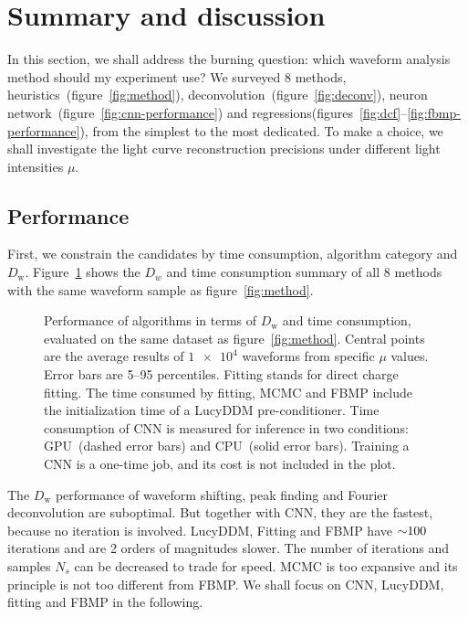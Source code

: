 \section{Summary and discussion}
\label{sec:discussion}

In this section, we shall address the burning question: which waveform analysis method should my experiment use?  We surveyed 8 methods, heuristics~(figure~\ref{fig:method}), deconvolution~(figure~\ref{fig:deconv}), neuron network~(figure~\ref{fig:cnn-performance}) and regressions(figures~\ref{fig:dcf}--\ref{fig:fbmp-performance}), from the simplest to the most dedicated.  To make a choice, we shall investigate the light curve reconstruction precisions under different light intensities $\mu$.

\subsection{Performance}

First, we constrain the candidates by time consumption, algorithm category and $D_\mathrm{w}$.  Figure~\ref{fig:chargesummary} shows the $D_w$ and time consumption summary of all 8 methods with the same waveform sample as figure~\ref{fig:method}.
\begin{figure}[H]
    \centering
    \resizebox{\textwidth}{!}{}
    \caption{\label{fig:chargesummary} Performance of algorithms in terms of $D_\mathrm{w}$ and time consumption, evaluated on the same dataset as figure~\ref{fig:method}. Central points are the average results of $\num[retain-unity-mantissa=false]{1e4}$ waveforms from specific $\mu$ values.  Error bars are 5--95 percentiles.  Fitting stands for direct charge fitting. The time consumed by fitting, MCMC and FBMP include the initialization time of a LucyDDM pre-conditioner.  Time consumption of CNN is measured for inference in two conditions: GPU\protect\footnotemark~(dashed error bars) and CPU\protect\footnotemark~(solid error bars).  Training a CNN is a one-time job, and its cost is not included in the plot.}
\end{figure}
\addtocounter{footnote}{-2}

The $D_\mathrm{w}$ performance of waveform shifting, peak finding and Fourier deconvolution are suboptimal.  But together with CNN, they are the fastest, because no iteration is involved.  LucyDDM, Fitting and FBMP have $\num{\sim 100}$ iterations and are 2 orders of magnitudes slower.  The number of iterations and samples $N_s$ can be decreased to trade for speed.  MCMC is too expansive and its principle is not too different from FBMP.  We shall focus on CNN, LucyDDM, fitting and FBMP in the following.

